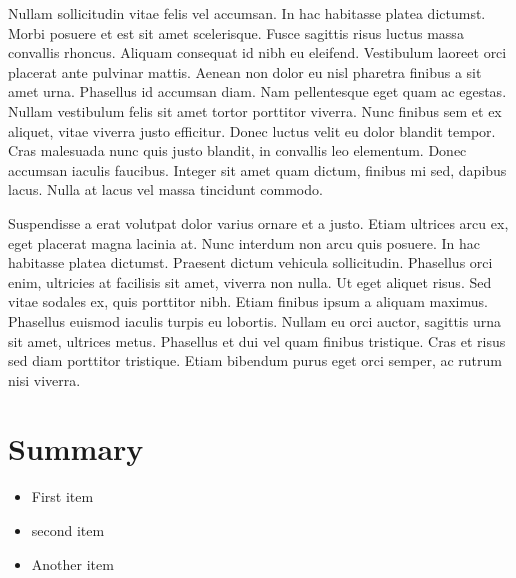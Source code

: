 \documentclass[final]{beamer}
\begin{document}
\begin{poster}
Nullam sollicitudin vitae felis vel accumsan. In hac habitasse platea dictumst. Morbi posuere et est sit amet scelerisque. Fusce sagittis risus luctus massa convallis rhoncus. Aliquam consequat id nibh eu eleifend. Vestibulum laoreet orci placerat ante pulvinar mattis. Aenean non dolor eu nisl pharetra finibus a sit amet urna. Phasellus id accumsan diam. Nam pellentesque eget quam ac egestas. Nullam vestibulum felis sit amet tortor porttitor viverra. Nunc finibus sem et ex aliquet, vitae viverra justo efficitur. Donec luctus velit eu dolor blandit tempor. Cras malesuada nunc quis justo blandit, in convallis leo elementum. Donec accumsan iaculis faucibus. Integer sit amet quam dictum, finibus mi sed, dapibus lacus. Nulla at lacus vel massa tincidunt commodo.

Suspendisse a erat volutpat dolor varius ornare et a justo. Etiam ultrices arcu ex, eget placerat magna lacinia at. Nunc interdum non arcu quis posuere. In hac habitasse platea dictumst. Praesent dictum vehicula sollicitudin. Phasellus orci enim, ultricies at facilisis sit amet, viverra non nulla. Ut eget aliquet risus. Sed vitae sodales ex, quis porttitor nibh. Etiam finibus ipsum a aliquam maximus. Phasellus euismod iaculis turpis eu lobortis. Nullam eu orci auctor, sagittis urna sit amet, ultrices metus. Phasellus et dui vel quam finibus tristique. Cras et risus sed diam porttitor tristique. Etiam bibendum purus eget orci semper, ac rutrum nisi viverra.

\section{Summary} \justifying
\begin{itemize}
    \item First item
    \item second item
    \item Another item
\end{itemize}


\end{poster}
\end{document}
